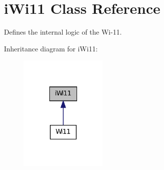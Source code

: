 \hypertarget{classiWi11}{
\section{iWi11 Class Reference}
\label{classiWi11}
}


Defines the internal logic of the Wi-\/11.  




Inheritance diagram for iWi11:
\nopagebreak
\begin{figure}[H]
\begin{center}
\leavevmode
\includegraphics[width=120pt]{classiWi11__inherit__graph}
\end{center}
\end{figure}

